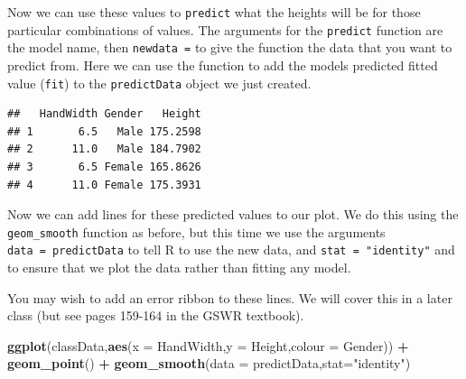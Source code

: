 \documentclass[
  a4paperpaper,
]{book}
\newenvironment{Shaded}{\begin{snugshade}}{\end{snugshade}}
\newcommand{\DataTypeTok}[1]{\textcolor[rgb]{0.13,0.29,0.53}{#1}}
\newcommand{\KeywordTok}[1]{\textcolor[rgb]{0.13,0.29,0.53}{\textbf{#1}}}
\newcommand{\NormalTok}[1]{#1}
\newcommand{\OperatorTok}[1]{\textcolor[rgb]{0.81,0.36,0.00}{\textbf{#1}}}
\newcommand{\StringTok}[1]{\textcolor[rgb]{0.31,0.60,0.02}{#1}}
\begin{document}
Now we can use these values to \texttt{predict} what the heights will be for those particular combinations of values. The arguments for the \texttt{predict} function are the model name, then \texttt{newdata\ =} to give the function the data that you want to predict from. Here we can use the function to add the models predicted fitted value (\texttt{fit}) to the \texttt{predictData} object we just created.

\begin{Shaded}
\end{Shaded}

\begin{verbatim}
##   HandWidth Gender   Height
## 1       6.5   Male 175.2598
## 2      11.0   Male 184.7902
## 3       6.5 Female 165.8626
## 4      11.0 Female 175.3931
\end{verbatim}

Now we can add lines for these predicted values to our plot. We do this using the \texttt{geom\_smooth} function as before, but this time we use the arguments \texttt{data\ =\ predictData} to tell R to use the new data, and \texttt{stat\ =\ "identity"} and to ensure that we plot the data rather than fitting any model.

You may wish to add an error ribbon to these lines. We will cover this in a later class (but see pages 159-164 in the GSWR textbook).

\begin{Shaded}
\begin{Highlighting}[]
\KeywordTok{ggplot}\NormalTok{(classData,}\KeywordTok{aes}\NormalTok{(}\DataTypeTok{x =}\NormalTok{ HandWidth,}\DataTypeTok{y =}\NormalTok{ Height,}\DataTypeTok{colour =}\NormalTok{ Gender)) }\OperatorTok{+}
\StringTok{  }\KeywordTok{geom\_point}\NormalTok{() }\OperatorTok{+}\StringTok{ }
\StringTok{  }\KeywordTok{geom\_smooth}\NormalTok{(}\DataTypeTok{data =}\NormalTok{ predictData,}\DataTypeTok{stat=}\StringTok{"identity"}\NormalTok{)           }
\end{Highlighting}
\end{Shaded}
\end{document}
